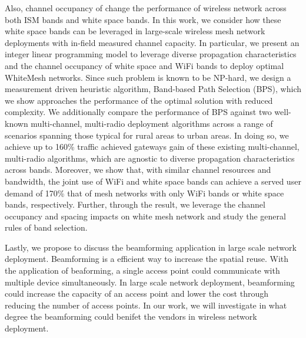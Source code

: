 Also, channel occupancy of change the performance of wireless network across 
both ISM bands and white space bands. In this work, we consider how these white 
space bands can be leveraged in large-scale wireless mesh network deployments 
with in-field measured channel capacity. In particular, we present an integer 
linear programming model to leverage diverse propagation characteristics and 
the  channel occupancy of white space and WiFi bands to deploy optimal WhiteMesh 
networks. Since such problem is known to be NP-hard, we design a measurement driven 
heuristic algorithm, Band-based Path Selection (BPS), which we show approaches 
the performance of the optimal solution with reduced complexity.  We additionally 
compare the performance of BPS against two well-known multi-channel, multi-radio 
deployment algorithms across a range of scenarios spanning those typical for 
rural areas to urban areas. In doing so, we achieve up to 160\% traffic achieved 
gateways gain of these existing multi-channel, multi-radio algorithms, which are 
agnostic to diverse propagation characteristics across bands.  Moreover, we show 
that, with similar channel resources and bandwidth, the joint use of WiFi and 
white space bands can achieve a served user demand of 170\% that of mesh networks 
with only WiFi bands or white space bands, respectively. Further, through the 
result, we leverage the channel occupancy and spacing impacts on white mesh
network and study the general rules of band selection.

Lastly, we propose to discuss the beamforming application in 
large scale network deployment. Beamforming is a efficient way to 
increase the spatial reuse. With the application of beaforming,
a single access point could communicate with multiple device 
simultaneously. In large scale network deployment, beamforming
could increase the capacity of an access point and lower the cost 
through reducing the number of access points. In our work, we
will investigate in what degree the beamforming could benifet
the vendors in wireless network deployment.


